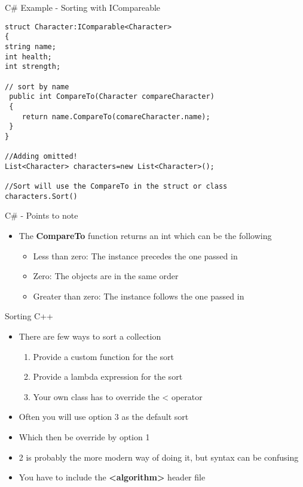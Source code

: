 \begin{frame}[fragile]{C\# Example - Sorting with ICompareable }
\begin{lstlisting}
struct Character:IComparable<Character>
{
string name;
int health;
int strength;

// sort by name
 public int CompareTo(Character compareCharacter)
 {
 	return name.CompareTo(comareCharacter.name);
 }
}

//Adding omitted!
List<Character> characters=new List<Character>();

//Sort will use the CompareTo in the struct or class
characters.Sort()
\end{lstlisting}
\end{frame}

\begin{frame}{C\# - Points to note}
	\begin{itemize}
		\pause \item The \textbf{CompareTo} function returns an int which can be the following
		\begin{itemize}
			\pause \item Less than zero: The instance precedes the one passed in
			\pause \item Zero: The objects are in the same order
			\pause \item Greater than zero: The instance follows the one passed in
		\end{itemize} 
	\end{itemize}
\end{frame}

\begin{frame}{Sorting C++}
\begin{itemize}
	\pause \item There are few ways to sort a collection
	\begin{enumerate}
		\pause \item Provide a custom function for the sort
		\pause \item Provide a lambda expression for the sort
		\pause \item Your own class has to override the < operator
	\end{enumerate}
	\pause \item Often you will use option 3 as the default sort
	\pause \item Which then be override by option 1 
	\pause \item 2 is probably the more modern way of doing it, but syntax can be confusing
	\pause \item You have to include the \textbf{<algorithm>} header file
\end{itemize}
\end{frame}


